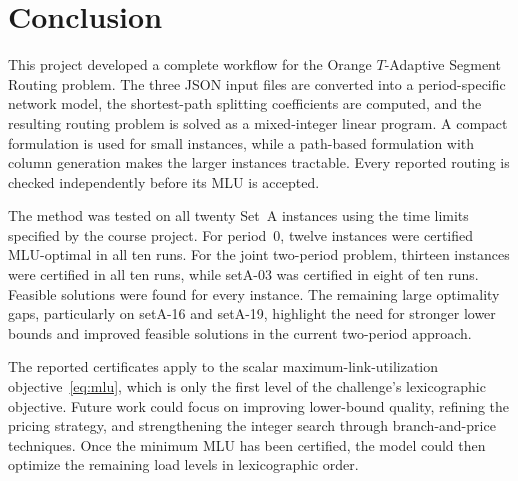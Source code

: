 \section{Conclusion}
\label{sec:conclusion}

This project developed a complete workflow for the Orange $T$-Adaptive Segment Routing problem. The
three JSON input files are converted into a period-specific network model, the shortest-path splitting
coefficients are computed, and the resulting routing problem is solved as a mixed-integer linear
program. A compact formulation is used for small instances, while a path-based formulation with column
generation makes the larger instances tractable. Every reported routing is checked independently
before its MLU is accepted.

The method was tested on all twenty Set~A instances using the time limits specified by the course
project. For period~0, twelve instances were certified MLU-optimal in all ten runs. For the joint
two-period problem, thirteen instances were certified in all ten runs, while setA-03 was certified in
eight of ten runs. Feasible solutions were found for every instance. The remaining large optimality
gaps, particularly on setA-16 and setA-19, highlight the need for stronger lower bounds and improved
feasible solutions in the current two-period approach.

The reported certificates apply to the scalar maximum-link-utilization objective~\eqref{eq:mlu}, which
is only the first level of the challenge's lexicographic objective. Future work could focus on
improving lower-bound quality, refining the pricing strategy, and strengthening the integer search
through branch-and-price techniques. Once the minimum MLU has been certified, the model could then
optimize the remaining load levels in lexicographic order.
